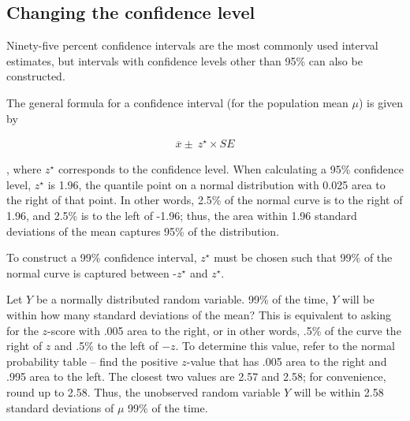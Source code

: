 \begin{spacing}{1.5}

\subsection{Changing the confidence level}
\label{changingTheConfidenceLevelSection}





Ninety-five percent confidence intervals are the most commonly used interval estimates, but intervals with confidence levels other than 95\% can also be constructed.

The general formula for a confidence interval (for the population mean $\mu$) is given by 

\begin{align}
	\overline{x} \pm \ z^{\star} \times SE
\end{align}

, where $z^{\star}$ corresponds to the confidence level. When calculating a 95\% confidence level, $z^{\star}$ is 1.96, the quantile point on a normal distribution with 0.025 area to the right of that point. In other words, 2.5\% of the normal curve is to the right of 1.96, and 2.5\% is to the left of -1.96; thus, the area within 1.96 standard deviations of the mean captures 95\% of the distribution.

To construct a 99\% confidence interval, $z^{\star}$ must be chosen such that 99\% of the normal curve is captured between -$z^{\star}$ and $z^{\star}$.

\begin{example}{Let $Y$ be a normally distributed random variable. 99\% of the time, $Y$ will be within how many standard deviations of the mean?}
	This is equivalent to asking for the $z$-score with .005 area to the right, or in other words, .5\% of the curve the right of $z$ and .5\% to the left of $-z$. To determine this value, refer to the normal probability table -- find the positive $z$-value that has .005 area to the right and .995 area to the left. The closest two values are 2.57 and 2.58; for convenience, round up to 2.58. Thus, the unobserved random variable $Y$ will be within 2.58 standard deviations of $\mu$ 99\% of the time.
\end{example}


\end{spacing}
